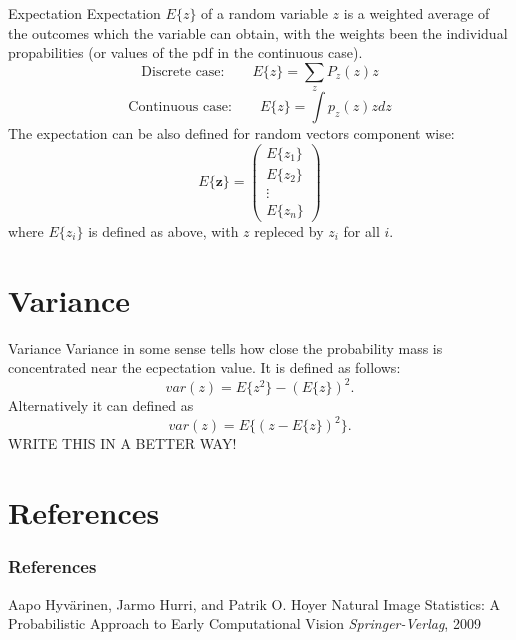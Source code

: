 \documentclass{beamer}
\begin{document}
\begin{frame}{Expectation}
  Expectation $E\{z\}$ of a random variable $z$ is a weighted average of the
  outcomes which the variable can obtain, with the weights been the individual
  propabilities (or values of the pdf in the continuous case).
  \[
  \text{Discrete case:} \qquad
  E\{z\} = \sum_{z} P_{z}(z)z
  \]
  \[
  \text{Continuous case:} \qquad
  E\{z\} = \int p_{z}(z)zdz
  \]
  The expectation can be also defined for random vectors component wise:
  \[
  E\{\mathbf{z}\} =
  \begin{pmatrix} E\{z_1\} \\ E\{z_2\} \\ \vdots \\ E\{z_n\} \end{pmatrix}
  \]
  where $E\{z_i\}$ is defined as above, with $z$ repleced by $z_i$ for all $i$.
\end{frame}

\section{Variance}

\begin{frame}{Variance}
  Variance in some sense tells how close the probability mass is concentrated
  near the ecpectation value. It is defined as follows:
  \[
  var(z)= E\{z^2\}-(E\{z\})^2.
  \]
  Alternatively it can defined as
  \[
   var(z) = E\{(z-E\{z\})^2\}.
  \]
  WRITE THIS IN A BETTER WAY!

\end{frame}

\section{References}

\begin{frame}
\frametitle{References}
\footnotesize{
\begin{thebibliography}{09}
 Aapo Hyvärinen, Jarmo Hurri, and Patrik O. Hoyer
\newblock Natural Image Statistics: A Probabilistic Approach to Early Computational Vision
\newblock \emph{Springer-Verlag}, 2009
\end{thebibliography}
}
\end{frame}
\end{document}
